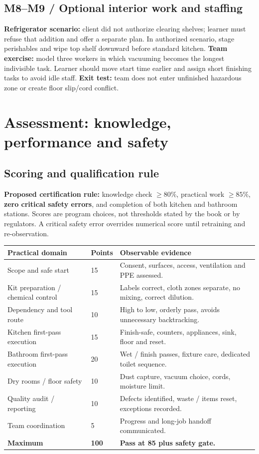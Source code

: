 \documentclass[10pt,letterpaper,oneside]{article}
\newcommand{\smalltable}{\par\small\renewcommand{\arraystretch}{1.24}}
\newcommand{\restorenormalfonttable}{\par\normalsize\renewcommand{\arraystretch}{1}}
\begin{document}
\subsection{M8--M9 / Optional interior work and staffing}
\textbf{Refrigerator scenario:} client did not authorize clearing shelves; learner must refuse that addition and offer a separate plan. In authorized scenario, stage perishables and wipe top shelf downward before standard kitchen. \textbf{Team exercise:} model three workers in which vacuuming becomes the longest indivisible task. Learner should move start time earlier and assign short finishing tasks to avoid idle staff. \textbf{Exit test:} team does not enter unfinished hazardous zone or create floor slip/cord conflict.

\section{Assessment: knowledge, performance and safety}
\subsection{Scoring and qualification rule}
\begin{notebox}\textbf{Proposed certification rule:} knowledge check \(\ge 80\%\), practical work \(\ge 85\%\), \textbf{zero critical safety errors}, and completion of both kitchen and bathroom stations. Scores are program choices, not thresholds stated by the book or by regulators. A critical safety error overrides numerical score until retraining and re-observation.\end{notebox}
\smalltable\begin{tabularx}{\linewidth}{p{.39\linewidth}p{.12\linewidth}X}\toprule
Practical domain & Points & Observable evidence\\\midrule
Scope and safe start & 15 & Consent, surfaces, access, ventilation and PPE assessed.\\
Kit preparation / chemical control & 15 & Labels correct, cloth zones separate, no mixing, correct dilution.\\
Dependency and tool route & 10 & High to low, orderly pass, avoids unnecessary backtracking.\\
Kitchen first-pass execution & 15 & Finish-safe, counters, appliances, sink, floor and reset.\\
Bathroom first-pass execution & 20 & Wet / finish passes, fixture care, dedicated toilet sequence.\\
Dry rooms / floor safety & 10 & Dust capture, vacuum choice, cords, moisture limit.\\
Quality audit / reporting & 10 & Defects identified, waste / items reset, exceptions recorded.\\
Team coordination & 5 & Progress and long-job handoff communicated.\\\midrule
\textbf{Maximum} & \textbf{100} & \textbf{Pass at 85 plus safety gate.}\\\bottomrule\end{tabularx}\restorenormalfonttable
\end{document}
